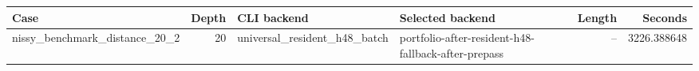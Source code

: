 {\small
\begin{tabular}{lrllrr}
\hline
Case & Depth & CLI backend & Selected backend & Length & Seconds \\
\hline
nissy\_benchmark\_distance\_20\_2 & 20 & universal\_resident\_h48\_batch & portfolio-after-resident-h48-fallback-after-prepass & -- & 3226.388648 \\
\hline
\end{tabular}
}
